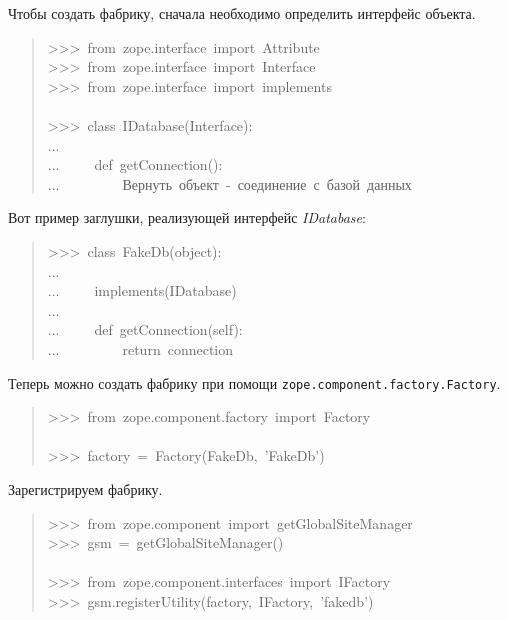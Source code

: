 \documentclass[a4paper,openany,twoside,final]{book}
\providecommand*{\DUroletitlereference}[1]{\textsl{#1}}
\begin{document}
Чтобы создать фабрику, сначала необходимо определить интерфейс
объекта.

\begin{quote}{\ttfamily \raggedright \noindent
>{}>{}>~from~zope.interface~import~Attribute\\
>{}>{}>~from~zope.interface~import~Interface\\
>{}>{}>~from~zope.interface~import~implements\\
~\\
>{}>{}>~class~IDatabase(Interface):\\
...\\
...~~~~~def~getConnection():\\
...~~~~~~~~~\textquotedbl{}\textquotedbl{}\textquotedbl{}Вернуть~объект~-~соединение~с~базой~данных\textquotedbl{}\textquotedbl{}\textquotedbl{}
}
\end{quote}

Вот пример заглушки, реализующей интерфейс \DUroletitlereference{IDatabase}:

\begin{quote}{\ttfamily \raggedright \noindent
>{}>{}>~class~FakeDb(object):\\
...\\
...~~~~~implements(IDatabase)\\
...\\
...~~~~~def~getConnection(self):\\
...~~~~~~~~~return~\textquotedbl{}connection\textquotedbl{}
}
\end{quote}

Теперь можно создать фабрику при помощи
\texttt{zope.component.factory.Factory}.

\begin{quote}{\ttfamily \raggedright \noindent
>{}>{}>~from~zope.component.factory~import~Factory\\
~\\
>{}>{}>~factory~=~Factory(FakeDb,~'FakeDb')
}
\end{quote}

Зарегистрируем фабрику.

\begin{quote}{\ttfamily \raggedright \noindent
>{}>{}>~from~zope.component~import~getGlobalSiteManager\\
>{}>{}>~gsm~=~getGlobalSiteManager()\\
~\\
>{}>{}>~from~zope.component.interfaces~import~IFactory\\
>{}>{}>~gsm.registerUtility(factory,~IFactory,~'fakedb')
}
\end{quote}
\end{document}
